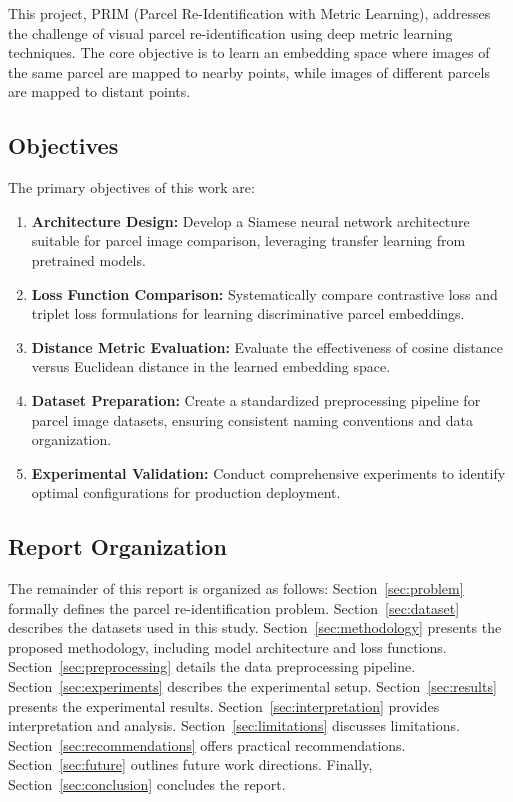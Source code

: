 \documentclass[12pt,a4paper]{article}
\begin{document}
This project, PRIM (Parcel Re-Identification with Metric Learning), addresses the challenge of visual parcel re-identification using deep metric learning techniques. The core objective is to learn an embedding space where images of the same parcel are mapped to nearby points, while images of different parcels are mapped to distant points.

\subsection{Objectives}

The primary objectives of this work are:

\begin{enumerate}
    \item \textbf{Architecture Design:} Develop a Siamese neural network architecture suitable for parcel image comparison, leveraging transfer learning from pretrained models.
    
    \item \textbf{Loss Function Comparison:} Systematically compare contrastive loss and triplet loss formulations for learning discriminative parcel embeddings.
    
    \item \textbf{Distance Metric Evaluation:} Evaluate the effectiveness of cosine distance versus Euclidean distance in the learned embedding space.
    
    \item \textbf{Dataset Preparation:} Create a standardized preprocessing pipeline for parcel image datasets, ensuring consistent naming conventions and data organization.
    
    \item \textbf{Experimental Validation:} Conduct comprehensive experiments to identify optimal configurations for production deployment.
\end{enumerate}

\subsection{Report Organization}

The remainder of this report is organized as follows: Section~\ref{sec:problem} formally defines the parcel re-identification problem. Section~\ref{sec:dataset} describes the datasets used in this study. Section~\ref{sec:methodology} presents the proposed methodology, including model architecture and loss functions. Section~\ref{sec:preprocessing} details the data preprocessing pipeline. Section~\ref{sec:experiments} describes the experimental setup. Section~\ref{sec:results} presents the experimental results. Section~\ref{sec:interpretation} provides interpretation and analysis. Section~\ref{sec:limitations} discusses limitations. Section~\ref{sec:recommendations} offers practical recommendations. Section~\ref{sec:future} outlines future work directions. Finally, Section~\ref{sec:conclusion} concludes the report.
\end{document}
